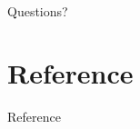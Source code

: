 \documentclass[xcolor=dvipsnames]{beamer}
\begin{document}

\begin{frame}{ $\text{ } $ }

\huge{Questions?}

\end{frame}




\section{Reference}
\begin{frame}[allowframebreaks]{Reference}






\end{frame}
\end{document}
